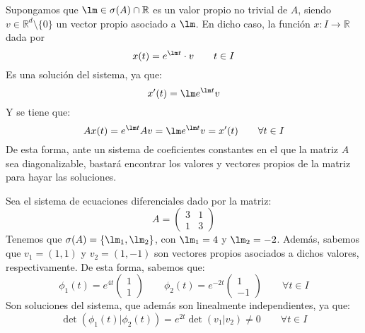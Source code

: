Supongamos que $\lm \in \sigma(A)\cap \mathbb{R}$ es un valor propio no trivial de $A$, siendo $v\in \mathbb{R}^d\setminus\{0\}$ un vector propio asociado a $\lm$. En dicho caso, la función $x:I\rightarrow\mathbb{R}$ dada por
\begin{equation*}
    x(t) = e^{\lm t} \cdot v \qquad t\in I
\end{equation*}
Es una solución del sistema, ya que:
\begin{equation*}
    x'(t) = \lm e^{\lm t} v 
\end{equation*}
Y se tiene que:
\begin{equation*}
    Ax(t) = e^{\lm t} Av = \lm e^{\lm t} v = x'(t) \qquad \forall t\in I
\end{equation*}
De esta forma, ante un sistema de coeficientes constantes en el que la matriz $A$ sea diagonalizable, bastará encontrar los valores y vectores propios de la matriz para hayar las soluciones.

\begin{ejemplo}
    Sea el sistema de ecuaciones diferenciales dado por la matriz:
    \begin{equation*}
        A = \left(\begin{array}{cc}
                3 & 1 \\
                1 & 3
        \end{array}\right)
    \end{equation*}
    Tenemos que $\sigma(A) = \{\lm_1, \lm_2\}$, con $\lm_1 = 4$ y $\lm_2 = -2$. Además, sabemos que $v_1=(1, 1)$ y $v_2 = (1, -1)$ son vectores propios asociados a dichos valores, respectivamente. De esta forma, sabemos que:
    \begin{equation*}
        \phi_1(t) = e^{4t} \left(\begin{array}{c}
            1 \\
            1
        \end{array}\right) \qquad 
        \phi_2(t) = e^{-2t} \left(\begin{array}{c}
            1 \\
            -1
        \end{array}\right) \qquad \forall t\in I
    \end{equation*}
    Son soluciones del sistema, que además son linealmente independientes, ya que:
    \begin{equation*}
        \det(\phi_1(t)|\phi_2(t)) = e^{2t} \det(v_1|v_2) \neq 0 \qquad \forall t\in I
    \end{equation*}
\end{ejemplo}

